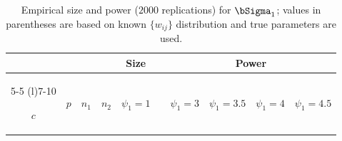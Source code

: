 \begin{table}[htbp]

    \caption{Empirical size and power ($2000$ replications) for $\bSigma_{1}$; values in parentheses are based on known $\{w_{ij}\}$ distribution and true parameters are used.}

    \label{tab:covtest-Sigma1}

    \scriptsize

    \begin{tabular}{ccccrrrrrr}

        \toprule

        & \multicolumn{1}{c}{} & \multicolumn{1}{c}{} & \multicolumn{1}{c}{} & \multicolumn{1}{c}{Size} & \multicolumn{1}{c}{} & \multicolumn{4}{c}{Power} \\

        \cmidrule(lr){5-5} \cmidrule(l){7-10}

        $c$ & \multicolumn{1}{c}{$p$} & \multicolumn{1}{c}{$n_{1}$} & \multicolumn{1}{c}{$n_{2}$} & \multicolumn{1}{c}{$\psi_{1}=1$} & \multicolumn{1}{c}{} & \multicolumn{1}{c}{$\psi_{1}=3$} & \multicolumn{1}{c}{$\psi_{1}=3.5$} & \multicolumn{1}{c}{$\psi_{1}=4$} & \multicolumn{1}{c}{$\psi_{1}=4.5$} \\

        \midrule


\end{tabular}
\end{table}
